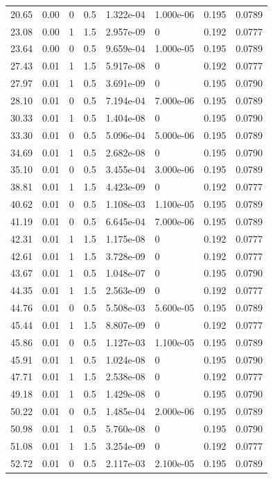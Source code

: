 \documentclass[preview]{standalone}
\begin{document}
{{\begin{tabular}{L{1.2cm}C{1.2cm} C{0.3cm}C{0.5cm} C{1.4cm}C{1.4cm} C{1.4cm}C{1.4cm}}
  20.65  &  0.00  & 0     & 0.5 &  1.322e-04  & 1.000e-06  & 0.195 &  0.0789   \\ 
  23.08  &  0.00  & 1     & 1.5 &  2.957e-09  & 0  & 0.192 &  0.0777   \\ 
  23.64  &  0.00  & 0     & 0.5 &  9.659e-04  & 1.000e-05  & 0.195 &  0.0789   \\ 
  27.43  &  0.01  & 1     & 1.5 &  5.917e-08  & 0  & 0.192 &  0.0777   \\ 
  27.97  &  0.01  & 1     & 0.5 &  3.691e-09  & 0  & 0.195 &  0.0790   \\ 
  28.10  &  0.01  & 0     & 0.5 &  7.194e-04  & 7.000e-06  & 0.195 &  0.0789   \\ 
  30.33  &  0.01  & 1     & 0.5 &  1.404e-08  & 0  & 0.195 &  0.0790   \\ 
  33.30  &  0.01  & 0     & 0.5 &  5.096e-04  & 5.000e-06  & 0.195 &  0.0789   \\ 
  34.69  &  0.01  & 1     & 0.5 &  2.682e-08  & 0  & 0.195 &  0.0790   \\ 
  35.10  &  0.01  & 0     & 0.5 &  3.455e-04  & 3.000e-06  & 0.195 &  0.0789   \\ 
  38.81  &  0.01  & 1     & 1.5 &  4.423e-09  & 0  & 0.192 &  0.0777   \\ 
  40.62  &  0.01  & 0     & 0.5 &  1.108e-03  & 1.100e-05  & 0.195 &  0.0789   \\ 
  41.19  &  0.01  & 0     & 0.5 &  6.645e-04  & 7.000e-06  & 0.195 &  0.0789   \\ 
  42.31  &  0.01  & 1     & 1.5 &  1.175e-08  & 0  & 0.192 &  0.0777   \\ 
  42.61  &  0.01  & 1     & 1.5 &  3.728e-09  & 0  & 0.192 &  0.0777   \\ 
  43.67  &  0.01  & 1     & 0.5 &  1.048e-07  & 0  & 0.195 &  0.0790   \\ 
  44.35  &  0.01  & 1     & 1.5 &  2.563e-09  & 0  & 0.192 &  0.0777   \\ 
  44.76  &  0.01  & 0     & 0.5 &  5.508e-03  & 5.600e-05  & 0.195 &  0.0789   \\ 
  45.44  &  0.01  & 1     & 1.5 &  8.807e-09  & 0  & 0.192 &  0.0777   \\ 
  45.86  &  0.01  & 0     & 0.5 &  1.127e-03  & 1.100e-05  & 0.195 &  0.0789   \\ 
  45.91  &  0.01  & 1     & 0.5 &  1.024e-08  & 0  & 0.195 &  0.0790   \\ 
  47.71  &  0.01  & 1     & 1.5 &  2.538e-08  & 0  & 0.192 &  0.0777   \\ 
  49.18  &  0.01  & 1     & 0.5 &  1.429e-08  & 0  & 0.195 &  0.0790   \\ 
  50.22  &  0.01  & 0     & 0.5 &  1.485e-04  & 2.000e-06  & 0.195 &  0.0789   \\ 
  50.98  &  0.01  & 1     & 0.5 &  5.760e-08  & 0  & 0.195 &  0.0790   \\ 
  51.08  &  0.01  & 1     & 1.5 &  3.254e-09  & 0  & 0.192 &  0.0777   \\ 
  52.72  &  0.01  & 0     & 0.5 &  2.117e-03  & 2.100e-05  & 0.195 &  0.0789   \\ 
\hline 
\end{tabular} 

}}
\end{document}
